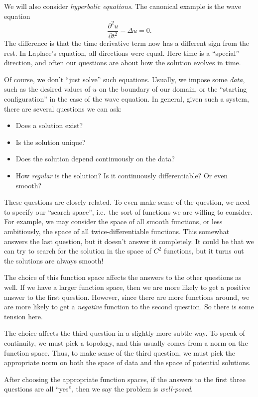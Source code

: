 \documentclass[a4paper]{article}
\begin{document}
We will also consider \emph{hyperbolic equations}. The canonical example is the wave equation
\[
  \frac{\partial^2 u}{\partial t^2} - \Delta u = 0.
\]
The difference is that the time derivative term now has a different sign from the rest. In Laplace's equation, all directions were equal. Here time is a ``special'' direction, and often our questions are about how the solution evolves in time.

Of course, we don't ``just solve'' such equations. Usually, we impose some \emph{data}, such as the desired values of $u$ on the boundary of our domain, or the ``starting configuration'' in the case of the wave equation. In general, given such a system, there are several questions we can ask:
\begin{itemize}
  \item Does a solution exist?
  \item Is the solution unique?
  \item Does the solution depend continuously on the data?
  \item How \emph{regular} is the solution? Is it continuously differentiable? Or even smooth?
\end{itemize}
These questions are closely related. To even make sense of the question, we need to specify our ``search space'', i.e.\ the sort of functions we are willing to consider. For example, we may consider the space of all smooth functions, or less ambitiously, the space of all twice-differentiable functions. This somewhat answers the last question, but it doesn't answer it completely. It could be that we can try to search for the solution in the space of $C^2$ functions, but it turns out the solutions are always smooth!

The choice of this function space affects the answers to the other questions as well. If we have a larger function space, then we are more likely to get a positive answer to the first question. However, since there are more functions around, we are more likely to get a \emph{negative} function to the second question. So there is some tension here.

The choice affects the third question in a slightly more subtle way. To speak of continuity, we must pick a topology, and this usually comes from a norm on the function space. Thus, to make sense of the third question, we must pick the appropriate norm on both the space of data and the space of potential solutions.

After choosing the appropriate function spaces, if the answers to the first three questions are all ``yes'', then we say the problem is \emph{well-posed}.
\end{document}
